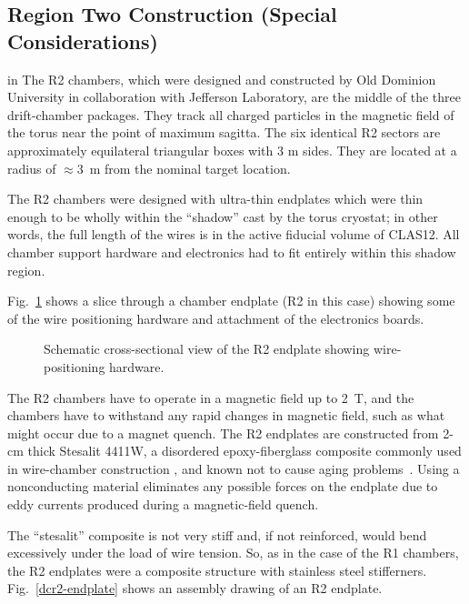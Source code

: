
\subsection{Region Two Construction (Special Considerations)}

 in 
The R2 chambers, which were designed and constructed by Old Dominion University 
in collaboration with Jefferson Laboratory, are the middle of the three  
drift-chamber packages.  They track all charged particles in the magnetic field 
of the torus near the point of maximum sagitta.  The six identical R2 sectors 
are approximately equilateral triangular boxes with 3 m sides. 
They are located at a radius of $\approx$3~m from the nominal target location.  
  
The R2 chambers were designed with ultra-thin endplates which were thin enough
to be wholly within the ``shadow'' cast by the torus cryostat; in other words,
the full length of the wires is in the active fiducial volume of CLAS12. 
All chamber support hardware and electronics had to fit 
entirely within this shadow region.


Fig.~\ref{dc-corner} shows a slice through a chamber endplate (R2 in this case)
showing some of the wire positioning hardware and attachment of the electronics 
boards.
\begin{figure}[htpb]   
\vspace{8cm}
\caption{\small{Schematic cross-sectional view of the R2 endplate showing
wire-positioning hardware.}}
\label{dc-corner}
\end{figure}   


The R2 chambers have to operate 
in a magnetic field up to 2~T, and the chambers have to withstand any rapid 
changes in magnetic field, such as what might occur due to a magnet quench.
The R2 endplates are constructed from 2-cm thick Stesalit 4411W, a disordered 
epoxy-fiberglass composite commonly used in wire-chamber construction
\cite{stesalit}, and known not to cause aging problems~\cite{stesalitaging}.  
Using a nonconducting material eliminates any possible forces on the endplate 
due to eddy currents produced during a magnetic-field quench.  

The ``stesalit'' composite is not very stiff and, if not reinforced, would
bend excessively under the load of wire tension.  So, as in the case of
the R1 chambers, the R2 endplates were a composite structure with
stainless steel stifferners.  Fig.~\ref{dcr2-endplate} shows an assembly drawing of an R2 endplate.

